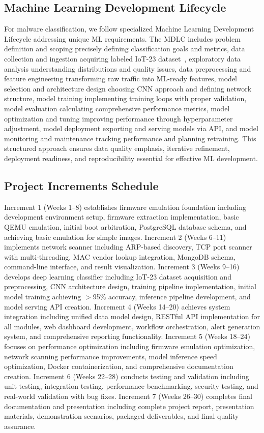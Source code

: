 \subsection{Machine Learning Development Lifecycle}

For malware classification, we follow specialized Machine Learning Development Lifecycle addressing unique ML requirements. The MDLC includes problem definition and scoping precisely defining classification goals and metrics, data collection and ingestion acquiring labeled IoT-23 dataset~\cite{stratosphere}, exploratory data analysis understanding distributions and quality issues, data preprocessing and feature engineering transforming raw traffic into ML-ready features, model selection and architecture design choosing CNN approach and defining network structure, model training implementing training loops with proper validation, model evaluation calculating comprehensive performance metrics, model optimization and tuning improving performance through hyperparameter adjustment, model deployment exporting and serving models via API, and model monitoring and maintenance tracking performance and planning retraining. This structured approach ensures data quality emphasis, iterative refinement, deployment readiness, and reproducibility essential for effective ML development.

\subsection{Project Increments Schedule}

Increment 1 (Weeks 1--8) establishes firmware emulation foundation including development environment setup, firmware extraction implementation, basic QEMU emulation, initial boot arbitration, PostgreSQL database schema, and achieving basic emulation for simple images. Increment 2 (Weeks 6--11) implements network scanner including ARP-based discovery, TCP port scanner with multi-threading, MAC vendor lookup integration, MongoDB schema, command-line interface, and result visualization. Increment 3 (Weeks 9--16) develops deep learning classifier including IoT-23 dataset acquisition and preprocessing, CNN architecture design, training pipeline implementation, initial model training achieving $>$95\% accuracy, inference pipeline development, and model serving API creation. Increment 4 (Weeks 14--20) achieves system integration including unified data model design, RESTful API implementation for all modules, web dashboard development, workflow orchestration, alert generation system, and comprehensive reporting functionality. Increment 5 (Weeks 18--24) focuses on performance optimization including firmware emulation optimization, network scanning performance improvements, model inference speed optimization, Docker containerization, and comprehensive documentation creation. Increment 6 (Weeks 22--28) conducts testing and validation including unit testing, integration testing, performance benchmarking, security testing, and real-world validation with bug fixes. Increment 7 (Weeks 26--30) completes final documentation and presentation including complete project report, presentation materials, demonstration scenarios, packaged deliverables, and final quality assurance.


